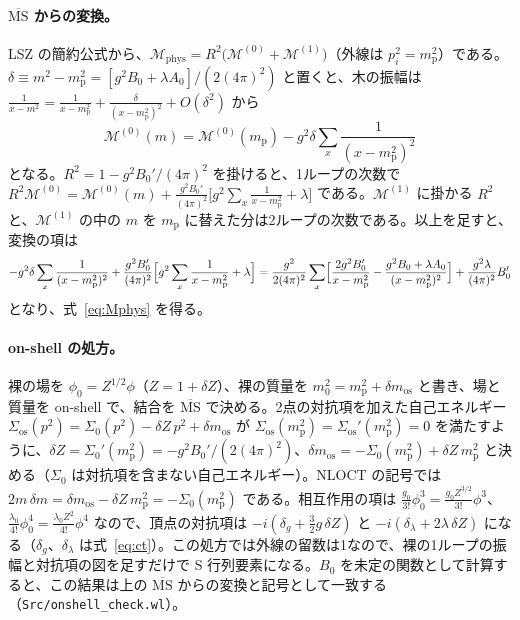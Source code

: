 \documentclass[a4paper,10pt]{ltjsarticle}
\begin{document}
\paragraph{$\overline{\mathrm{MS}}$ からの変換。}LSZ の簡約公式から、$\mathcal{M}_{\mathrm{phys}}=R^2\bigl(\mathcal{M}^{(0)}+\mathcal{M}^{(1)}\bigr)$（外線は $p_i^2=m_{\mathrm p}^2$）である。$\delta\equiv m^2-m_{\mathrm p}^2=[g^2B_0+\lambda A_0]/(2(4\pi)^2)$ と置くと、木の振幅は $\frac{1}{x-m^2}=\frac{1}{x-m_{\mathrm p}^2}+\frac{\delta}{(x-m_{\mathrm p}^2)^2}+O(\delta^2)$ から
\begin{equation*}
\mathcal{M}^{(0)}(m)=\mathcal{M}^{(0)}(m_{\mathrm p})-g^2\delta\sum_x\frac{1}{(x-m_{\mathrm p}^2)^2}
\end{equation*}
となる。$R^2=1-g^2B_0'/(4\pi)^2$ を掛けると、1ループの次数で $R^2\mathcal{M}^{(0)}=\mathcal{M}^{(0)}(m)+\frac{g^2B_0'}{(4\pi)^2}\bigl[g^2\sum_x\frac1{x-m_{\mathrm p}^2}+\lambda\bigr]$ である。$\mathcal{M}^{(1)}$ に掛かる $R^2$ と、$\mathcal{M}^{(1)}$ の中の $m$ を $m_{\mathrm p}$ に替えた分は2ループの次数である。以上を足すと、変換の項は
\begin{equation*}
-g^2\delta\sum_x\frac{1}{(x-m_{\mathrm p}^2)^2}+\frac{g^2B_0'}{(4\pi)^2}\Bigl[g^2\sum_x\frac1{x-m_{\mathrm p}^2}+\lambda\Bigr]
=\frac{g^2}{2(4\pi)^2}\sum_x\Bigl[\frac{2g^2B_0'}{x-m_{\mathrm p}^2}-\frac{g^2B_0+\lambda A_0}{(x-m_{\mathrm p}^2)^2}\Bigr]+\frac{g^2\lambda}{(4\pi)^2}B_0'
\end{equation*}
となり、式~\eqref{eq:Mphys} を得る。

\paragraph{on-shell の処方。}裸の場を $\phi_0=Z^{1/2}\phi$（$Z=1+\delta Z$）、裸の質量を $m_0^2=m_{\mathrm p}^2+\delta m_{\mathrm{os}}$ と書き、場と質量を on-shell で、結合を $\overline{\mathrm{MS}}$ で決める。2点の対抗項を加えた自己エネルギー $\Sigma_{\mathrm{os}}(p^2)=\Sigma_0(p^2)-\delta Z\,p^2+\delta m_{\mathrm{os}}$ が $\Sigma_{\mathrm{os}}(m_{\mathrm p}^2)=\Sigma_{\mathrm{os}}'(m_{\mathrm p}^2)=0$ を満たすように、$\delta Z=\Sigma_0'(m_{\mathrm p}^2)=-g^2B_0'/(2(4\pi)^2)$、$\delta m_{\mathrm{os}}=-\Sigma_0(m_{\mathrm p}^2)+\delta Z\,m_{\mathrm p}^2$ と決める（$\Sigma_0$ は対抗項を含まない自己エネルギー）。NLOCT の記号では $2m\,\delta m=\delta m_{\mathrm{os}}-\delta Z\,m_{\mathrm p}^2=-\Sigma_0(m_{\mathrm p}^2)$ である。相互作用の項は $\frac{g_0}{3!}\phi_0^3=\frac{g_0Z^{3/2}}{3!}\phi^3$、$\frac{\lambda_0}{4!}\phi_0^4=\frac{\lambda_0Z^2}{4!}\phi^4$ なので、頂点の対抗項は $-i(\delta_g+\frac32g\,\delta Z)$ と $-i(\delta_\lambda+2\lambda\,\delta Z)$ になる（$\delta_g$、$\delta_\lambda$ は式~\eqref{eq:ct}）。この処方では外線の留数は1なので、裸の1ループの振幅と対抗項の図を足すだけで S 行列要素になる。$B_0$ を未定の関数として計算すると、この結果は上の $\overline{\mathrm{MS}}$ からの変換と記号として一致する（\texttt{Src/onshell\_check.wl}）。
\end{document}
